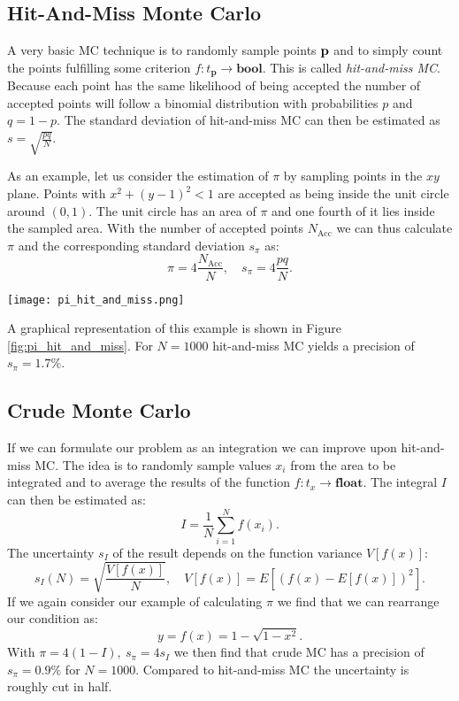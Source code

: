 \subsection{Hit-And-Miss Monte Carlo}
A very basic MC technique is to randomly sample points $\bf p$ and to simply count the points fulfilling some criterion
$f : t_\mathbf{p} \rightarrow \mathbf{bool}$.
This is called \textit{hit-and-miss MC}.
Because each point has the same likelihood of being accepted the number of accepted points will follow a binomial distribution
with probabilities $p$ and $q = 1 - p$.
The standard deviation of hit-and-miss MC can then be estimated as $s = \sqrt{\frac{pq}{N}}$.

As an example, let us consider the estimation of $\pi$ by sampling points in the $xy$ plane.
Points with $x^2 + (y - 1)^2 < 1$ are accepted as being inside the unit circle around $(0, 1)$.
The unit circle has an area of $\pi$ and one fourth of it lies inside the sampled area.
With the number of accepted points $N_\mathrm{Acc}$ we can thus calculate $\pi$ and the corresponding standard deviation $s_\pi$ as:
\begin{equation}
	\pi = 4 \frac{N_\mathrm{Acc}}{N}, \quad s_\pi = 4 \frac{pq}{N}.
\end{equation}
\begin{figure*}
	\centering
	\texttt{[image: pi\_hit\_and\_miss.png]}
	\caption{
		Visualization of hit-and-miss MC.
		Randomly sampled points are accepted if they are inside the circle around the upper left corner.
	}
	\label{fig:pi_hit_and_miss}
\end{figure*}
A graphical representation of this example is shown in Figure \ref{fig:pi_hit_and_miss}.
For $N = 1000$ hit-and-miss MC yields a precision of $s_\pi = 1.7\%$.
\subsection{Crude Monte Carlo}
If we can formulate our problem as an integration we can improve upon hit-and-miss MC.
The idea is to randomly sample values $x_i$ from the area to be integrated
and to average the results of the function $f : t_x \rightarrow \mathbf{float}$.
The integral $I$ can then be estimated as:
\begin{equation}
	I = \frac{1}{N} \sum_{i=1}^N f(x_i).
\end{equation}
The uncertainty $s_I$ of the result depends on the function variance $V[f(x)]$:
\begin{equation}
	s_I(N) = \sqrt{\frac{V[f(x)]}{N}}, \quad V[f(x)] = E \left[ (f(x) - E[f(x)])^2 \right].
\end{equation}
If we again consider our example of calculating $\pi$ we find that we can rearrange our condition as:
\begin{equation}
	y = f(x) = 1 - \sqrt{1 - x^2}.
\end{equation}
With $\pi = 4 (1 - I), \: s_\pi = 4 s_I$ we then find that crude MC has a precision of $s_\pi = 0.9\%$ for $N = 1000$.
Compared to hit-and-miss MC the uncertainty is roughly cut in half.
